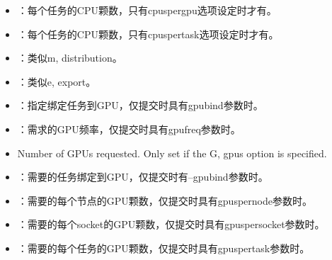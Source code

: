 \documentclass[a4paper,12pt,english]{sphinxmanual}
\begin{document}
\begin{itemize}
\item {} 
\sphinxAtStartPar
{}：每个任务的CPU颗数，只有\sphinxhyphen{}\sphinxhyphen{}cpus\sphinxhyphen{}per\sphinxhyphen{}gpu选项设定时才有。

\item {} 
\sphinxAtStartPar
{}：每个任务的CPU颗数，只有\sphinxhyphen{}\sphinxhyphen{}cpus\sphinxhyphen{}per\sphinxhyphen{}task选项设定时才有。

\item {} 
\sphinxAtStartPar
{}：类似\sphinxhyphen{}m, \sphinxhyphen{}\sphinxhyphen{}distribution。

\item {} 
\sphinxAtStartPar
{}：类似\sphinxhyphen{}e, \sphinxhyphen{}\sphinxhyphen{}export。

\item {} 
\sphinxAtStartPar
{}：指定绑定任务到GPU，仅提交时具有\sphinxhyphen{}\sphinxhyphen{}gpu\sphinxhyphen{}bind参数时。

\item {} 
\sphinxAtStartPar
{}：需求的GPU频率，仅提交时具有\sphinxhyphen{}\sphinxhyphen{}gpu\sphinxhyphen{}freq参数时。

\item {} 
\sphinxAtStartPar
{} Number of GPUs requested. Only set if the \sphinxhyphen{}G, \sphinxhyphen{}\sphinxhyphen{}gpus option is specified.

\item {} 
\sphinxAtStartPar
{}：需要的任务绑定到GPU，仅提交时有–gpu\sphinxhyphen{}bind参数时。

\item {} 
\sphinxAtStartPar
{}：需要的每个节点的GPU颗数，仅提交时具有\sphinxhyphen{}\sphinxhyphen{}gpus\sphinxhyphen{}per\sphinxhyphen{}node参数时。

\item {} 
\sphinxAtStartPar
{}：需要的每个socket的GPU颗数，仅提交时具有\sphinxhyphen{}\sphinxhyphen{}gpus\sphinxhyphen{}per\sphinxhyphen{}socket参数时。

\item {} 
\sphinxAtStartPar
{}：需要的每个任务的GPU颗数，仅提交时具有\sphinxhyphen{}\sphinxhyphen{}gpus\sphinxhyphen{}per\sphinxhyphen{}task参数时。


\end{itemize}
\end{document}
